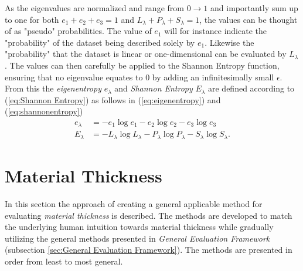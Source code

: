 \documentclass[%
]{USN-MSc}
\begin{document}
As the eigenvalues are normalized and range from \(0 \to 1\) and importantly sum up to one for both \(e_1 + e_2 + e_3 = 1\) and \(L_\lambda + P_\lambda + S_\lambda = 1\), the values can be thought of as "pseudo" probabilities. The value of \(e_1\) will for instance indicate the "probability" of the dataset being described solely by \(e_1\). Likewise the "probability" that the dataset is linear or one-dimensional can be evaluated by \(L_\lambda\). The values can then carefully be applied to the Shannon Entropy function, ensuring that no eigenvalue equates to 0 by adding an infinitesimally small \(\epsilon\). From this the \textit{eigenentropy} \(e_\lambda\) and \textit{Shannon Entropy} \(E_\lambda\) are defined according to (\ref{eq:Shannon Entropy}) as follows in (\ref{eq:eigenentropy}) and (\ref{eq:shannonentropy})
\begin{align}
\label{eq:eigenentropy}
e_\lambda &= - e_1\log e_1 - e_2\log e_2 - e_3\log e_3  \\
\label{eq:shannonentropy}
E_\lambda &= - L_\lambda\log L_\lambda - P_\lambda\log P_\lambda - S_\lambda\log S_\lambda .
\end{align}

\clearpage


\section{Material Thickness}
\label{sec:Material Thickness}
In this section the approach of creating a general applicable method for evaluating \textit{material thickness} is described. The methods are developed to match the underlying human intuition towards material thickness while gradually utilizing the general methods presented in \textit{General Evaluation Framework} (subsection \ref{sec:General Evaluation Framework}). The methods are presented in order from least to most general.
\end{document}
